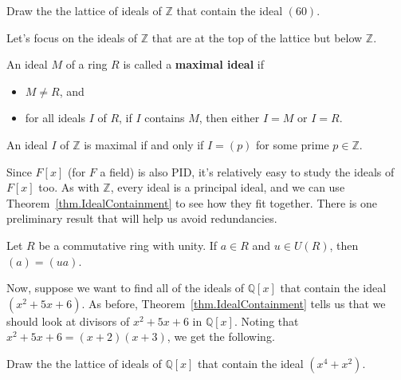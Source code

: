 \begin{problem}
Draw the the lattice of ideals of $\mathbb{Z}$ that contain the ideal $(60)$.
\end{problem}

Let's focus on the ideals of $\mathbb{Z}$ that are at the top of the lattice but below $\mathbb{Z}$.

\begin{definition}
An ideal $M$ of a ring $R$ is called a \textbf{maximal ideal} if 
\begin{itemize}
\item $M\neq R$, and 
\item for all ideals $I$ of $R$, if $I$ contains $M$, then either $I=M$ or $I =R$.
\end{itemize}
\end{definition}

\begin{theorem}
An ideal $I$ of $\mathbb{Z}$ is maximal if and only if $I=(p)$ for some prime $p\in \mathbb{Z}$.
\end{theorem}

Since $F[x]$ (for $F$ a field) is also PID, it's relatively easy to study the ideals of $F[x]$ too. As with $\mathbb{Z}$, every ideal is a principal ideal, and we can use Theorem~\ref{thm.IdealContainment} to see how they fit together. There is one preliminary result that will help us avoid redundancies.

\begin{theorem}\label{thm.DifferByUnitSameIdeal}
Let $R$ be a commutative ring with unity. If $a \in R$ and $u\in U(R)$, then $(a) = (ua)$.
\end{theorem}

Now, suppose we want to find all of the ideals of $\mathbb{Q}[x]$ that contain the ideal $(x^2+5x+6)$. As before, Theorem~\ref{thm.IdealContainment} tells us that we should look at divisors of $x^2+5x+6$ in $\mathbb{Q}[x]$. Noting that $x^2+5x+6 =  (x+2)(x+3)$, we get the following. 
\begin{center}
\end{center}


\begin{problem}
Draw the the lattice of ideals of $\mathbb{Q}[x]$ that contain the ideal $(x^4 +x^2)$.
\end{problem}

